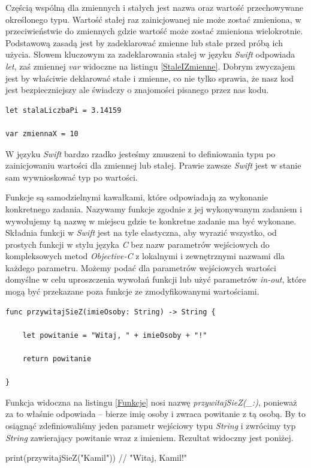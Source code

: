 \documentclass{iiuwb}
\begin{document}
Częścią wspólną dla zmiennych i stałych jest nazwa oraz wartość przechowywane określonego typu. Wartość stałej raz zainicjowanej nie może zostać zmieniona, w przeciwieństwie do zmiennych gdzie wartość może zostać zmieniona wielokrotnie. Podstawową zasadą jest by zadeklarować zmienne lub stałe przed próbą ich użycia. Słowem kluczowym za zadeklarowania stałej w języku \textit{Swift} odpowiada \textit{let}, zaś zmiennej \textit{var} widoczne na listingu \ref{StaleIZmienne}. Dobrym zwyczajem jest by właściwie deklarować stałe i zmienne, co nie tylko sprawia, że nasz kod jest bezpieczniejszy ale świadczy o znajomości pisanego przez nas kodu.
\begin{lstlisting}[label=StaleIZmienne, caption=Deklaracja stałych i zmiennych w Swift]
let stalaLiczbaPi = 3.14159

var zmiennaX = 10
\end{lstlisting}
W języku \textit{Swift} bardzo rzadko jesteśmy zmuszeni to definiowania typu po zainicjowaniu wartości dla zmiennej lub stałej. Prawie zawsze \textit{Swift} jest w stanie sam wywnioskować typ po wartości.

Funkcje są samodzielnymi kawałkami, które odpowiadają za wykonanie konkretnego zadania. Nazywamy funkcje zgodnie z jej wykonywanym zadaniem i wywołujemy tą nazwę w miejscu gdzie te konkretne zadanie ma być wykonane. Składnia funkcji w \textit{Swift} jest na tyle elastyczna, aby wyrazić wszystko, od prostych funkcji w stylu języka \textit{C} bez nazw parametrów wejściowych do kompleksowych metod \textit{Objective-C} z lokalnymi i zewnętrznymi nazwami dla każdego parametru. Możemy podać dla parametrów wejściowych wartości domyślne w celu uproszczenia wywołań funkcji lub użyć parametrów \textit{in-out}, które mogą być przekazane poza funkcje ze zmodyfikowanymi wartościami.
\begin{lstlisting}[label=Funkcje, caption=Definicja funkcji w języku Swift]
func przywitajSieZ(imieOsoby: String) -> String {
	
	let powitanie = "Witaj, " + imieOsoby + "!"
	
	return powitanie 
	
}

\end{lstlisting}
Funkcja widoczna na listingu \ref{Funkcje} nosi nazwę \textit{przywitajSieZ(\_:)}, ponieważ za to właśnie odpowiada -- bierze imię osoby i zwraca powitanie z tą osobą. By to osiągnąć zdefiniowaliśmy jeden parametr wejściowy typu \textit{String} i zwrócimy typ \textit{String} zawierający powitanie wraz z imieniem. Rezultat widoczny jest poniżej.
\begin{center}
	print(przywitajSieZ("Kamil")) // "Witaj, Kamil!"
\end{center}
\end{document}
